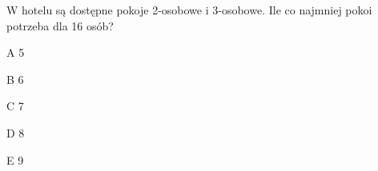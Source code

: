 \begin{tresc}
W hotelu są dostępne pokoje 2-osobowe i 3-osobowe. Ile co najmniej pokoi potrzeba dla 16 osób?
\end{tresc}
\begin{wariant}{A} 5 \end{wariant}
\begin{wariant}{B} 6 \end{wariant}
\begin{wariant}{C} 7 \end{wariant}
\begin{wariant}{D} 8 \end{wariant}
\begin{wariant}{E} 9 \end{wariant}
